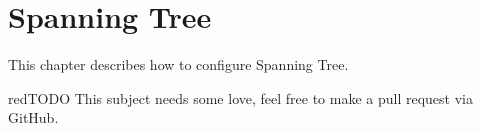 \section{Spanning Tree}
This chapter describes how to configure Spanning Tree.
\begin{textbox}{red}{TODO}
This subject needs some love, feel free to make a pull request via GitHub.
\end{textbox}

